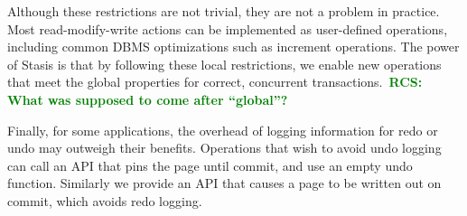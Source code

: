 \documentclass[letterpaper,twocolumn,10pt]{article}
\newcommand{\yad}{Stasis\xspace}
\newcommand{\rcs}[1]{\textcolor{green}{\bf RCS: #1}}
\newcommand{\eat}[1]{}
\begin{document}
Although these restrictions are not trivial, they are not a problem in
practice. Most read-modify-write actions can be implemented as
user-defined operations, including common DBMS optimizations such as
increment operations.  The power of \yad is that by following these
local restrictions, we enable new operations that meet the global
properties for correct, concurrent transactions.~\rcs{What was supposed to come after ``global''?}

Finally, for some applications, the overhead of logging information for redo or
undo may outweigh their benefits.  Operations that wish to avoid undo
logging can call an API that pins the page until commit, and use an
empty undo function.  Similarly we provide an API that causes a page
to be written out on commit, which avoids redo logging.


\eat{
Note that we could implement a limited form of transactions by
limiting each transaction to a single operation, and by forcing the
page that each operation updates to disk in order.  If we ignore torn
pages and failed sectors, this does not require any sort of logging,
but is quite inefficient in practice, as it forces the disk to perform
a potentially random write each time the page file is updated.

The rest of this section describes how recovery can be extended,
first to support multiple operations per transaction efficiently, and
then to allow more than one transaction to modify the same data before
committing.
}
\end{document}
